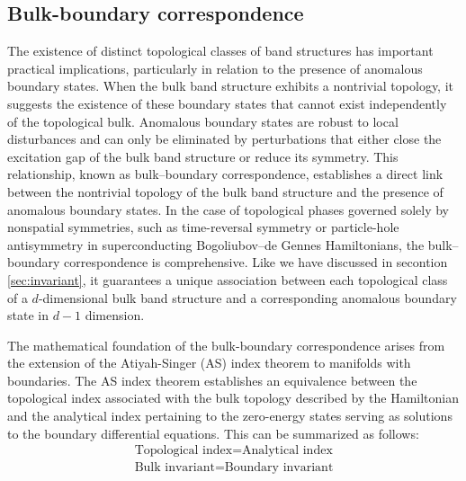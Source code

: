 \subsection{Bulk-boundary correspondence}
The existence of distinct topological classes of band structures has important practical implications, particularly in relation to the presence of anomalous boundary states. When the bulk band structure exhibits a nontrivial topology, it suggests the existence of these boundary states that cannot exist independently of the topological bulk. Anomalous boundary states are robust to local disturbances and can only be eliminated by perturbations that either close the excitation gap of the bulk band structure or reduce its symmetry. This relationship, known as bulk–boundary correspondence, establishes a direct link between the nontrivial topology of the bulk band structure and the presence of anomalous boundary states. In the case of topological phases governed solely by nonspatial symmetries, such as time-reversal symmetry or particle-hole antisymmetry in superconducting Bogoliubov–de Gennes Hamiltonians, the bulk–boundary correspondence is comprehensive. Like we have discussed in secontion \ref{sec:invariant}, it guarantees a unique association between each topological class of a $d$-dimensional bulk band structure and a corresponding anomalous boundary state in $d-1$ dimension.

The mathematical foundation of the bulk-boundary correspondence arises from the extension of the Atiyah-Singer (AS) index theorem to manifolds with boundaries\cite{fukui2012bulk, fukaya2020physicist, hatsugai1993chern, essin2011bulk}. The AS index theorem establishes an equivalence between the topological index associated with the bulk topology described by the Hamiltonian and the analytical index pertaining to the zero-energy states serving as solutions to the boundary differential equations. This can be summarized as follows:
\begin{align}
\text{Topological index} = \text{Analytical index}\\
\text{Bulk invariant} = \text{Boundary invariant}
\end{align}


